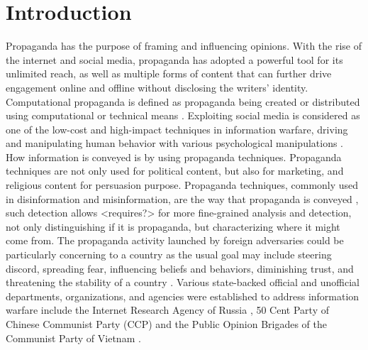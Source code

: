 \documentclass[sigconf]{acmart}
\begin{document}




\maketitle

\section{Introduction}

Propaganda has the purpose of framing and influencing opinions. With the rise of the internet and social media, propaganda has adopted a powerful tool for its unlimited reach, as well as multiple forms of content that can further drive engagement online and offline without disclosing the writers’ identity. Computational propaganda is defined as propaganda being created or distributed using computational or technical means \cite{bolsover2017computational}. Exploiting social media is considered as one of the low-cost and high-impact techniques in information warfare, driving and manipulating human behavior with various psychological manipulations \cite{10.2307/26481910}. How information is conveyed is by using propaganda techniques. Propaganda techniques are not only used for political content, but also for marketing, and religious content for persuasion purpose. Propaganda techniques, commonly used in disinformation and misinformation, are the way that propaganda is conveyed \cite{da2019fine}, such detection allows <requires?> for more fine-grained analysis and detection, not only distinguishing if it is propaganda, but characterizing where it might come from. The propaganda activity launched by foreign adversaries could be particularly concerning to a country as the usual goal may include steering discord, spreading fear, influencing beliefs and behaviors, diminishing trust, and threatening the stability of a country  \cite{10.2307/26481910}. Various state-backed official and unofficial departments, organizations, and agencies were established to address information warfare include the Internet Research Agency of Russia \cite{diresta2019tactics}, 50 Cent Party \cite{king2017chinese} \cite{han2015manufacturing} of Chinese Communist Party (CCP) and the Public Opinion Brigades of the Communist Party of Vietnam \cite{bradshaw2017troops}.
\end{document}

